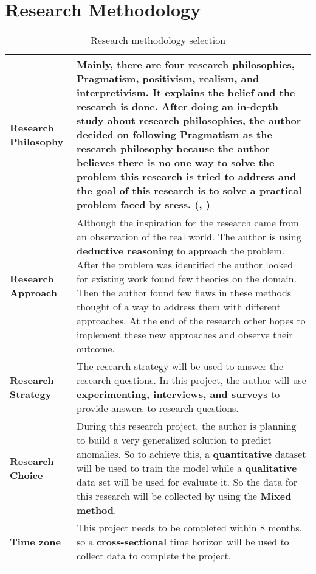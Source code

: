 
{\let\clearpage\relax \chapter{Research Methodology}}

\begin{longtable}{|p{35mm}|p{125mm}|}
\hline
  \textbf{Research Philosophy} & 
  Mainly, there are four research philosophies, Pragmatism, positivism, realism, and interpretivism. It explains the belief and the research is done. After doing an in-depth study about research philosophies, the author decided on following \textbf{Pragmatism} as the research philosophy because the author believes there is no one way to solve the problem this research is tried to address and the goal of this research is to solve a practical problem faced by \acp{sres}. (\cite{1Philoso75:online}, \cite{Pragmati87:online})
  \\ \hline
  
  \textbf{Research Approach} & 
  Although the inspiration for the research came from an observation of the real world. The author is using \textbf{deductive reasoning} to approach the problem. After the problem was identified the author looked for existing work found few theories on the domain. Then the author found few flaws in these methods thought of a way to address them with different approaches. At the end of the research other hopes to implement these new approaches and observe their outcome.
  \\ \hline
  
  \textbf{Research Strategy} & 
  The research strategy will be used to answer the research questions. In this project, the author will use \textbf{experimenting, interviews, and surveys} to provide answers to research questions.
  \\ \hline
  
  \textbf{Research Choice} & 
  During this research project, the author is planning to build a very generalized solution to predict anomalies.  So to achieve this, a \textbf{quantitative} dataset will be used to train the model while a \textbf{qualitative} data set will be used for evaluate it. So the data for this research will be collected by using the \textbf{Mixed method}.
  \\ \hline
  
  \textbf{Time zone} & 
  This project needs to be completed within 8 months, so a \textbf{cross-sectional} time horizon will be used to collect data to complete the project.
  \\ \hline
  \caption{Research methodology selection}
\end{longtable}
